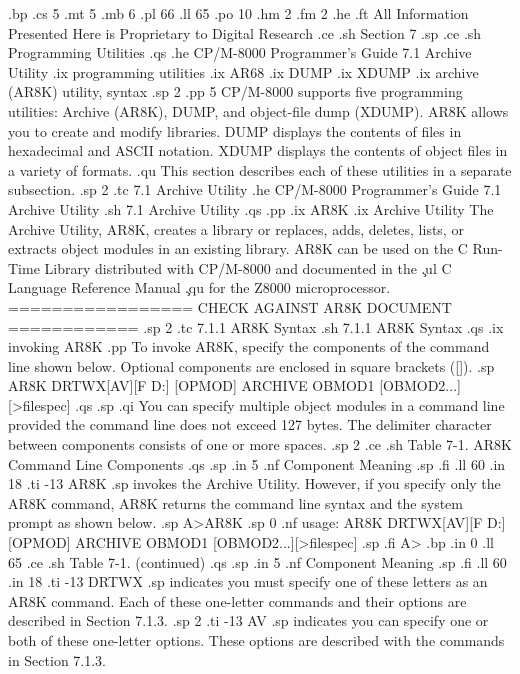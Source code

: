 .bp
.cs 5
.mt 5
.mb 6
.pl 66
.ll 65
.po 10
.hm 2
.fm 2
.he
.ft All Information Presented Here is Proprietary to Digital Research
.ce
.sh
Section 7
.sp
.ce
.sh 
Programming Utilities
.qs
.he CP/M-8000 Programmer's Guide                  7.1  Archive Utility
.ix programming utilities
.ix AR68
.ix DUMP
.ix XDUMP
.ix archive (AR8K) utility, syntax
.sp 2
.pp 5
CP/M-8000 supports five programming utilities: Archive 
(AR8K), DUMP, and object-file dump (XDUMP).
AR8K allows you to create and modify libraries.  DUMP displays the
contents of files in hexadecimal and ASCII notation.  
XDUMP displays the contents of object files in a variety of formats.
.qu
This section describes each of these utilities in a
separate subsection. 
.sp 2
.tc    7.1  Archive Utility
.he CP/M-8000 Programmer's Guide                  7.1  Archive Utility
.sh
7.1  Archive Utility
.qs
.pp 
.ix AR8K
.ix Archive Utility
The Archive Utility, AR8K, creates a library or replaces, adds,
deletes, lists, or extracts object modules in an existing
library.  AR8K can be used on the C Run-Time Library distributed
with CP/M-8000 and documented in the \c
.ul
C Language Reference Manual \c
.qu
for the Z8000 microprocessor. 
================= CHECK AGAINST AR8K DOCUMENT ============
.sp 2
.tc         7.1.1  AR8K Syntax
.sh
7.1.1  AR8K Syntax
.qs
.ix invoking AR8K 
.pp
To invoke AR8K, specify the components of the command line shown 
below.  Optional components are enclosed in square brackets ([]).
.sp
AR8K DRTWX[AV][F D:] [OPMOD] ARCHIVE OBMOD1 [OBMOD2...][>filespec]
.qs
.sp 
.qi
You can specify multiple object modules in a command line
provided the command line does not exceed 127 bytes.  The
delimiter character between components consists of one or more
spaces. 
.sp 2
.ce
.sh
Table 7-1.  AR8K Command Line Components
.qs
.sp
.in 5
.nf
Component    Meaning
.sp
.fi
.ll 60
.in 18
.ti -13
AR8K         
.sp
invokes the Archive Utility.  However, if you
specify only the AR8K command, AR8K returns the command line
syntax and the system prompt as shown below. 
.sp
A>AR8K
.sp 0
.nf
usage:  AR8K DRTWX[AV][F D:] [OPMOD] ARCHIVE OBMOD1 [OBMOD2...][>filespec]
.sp
.fi
A>
.bp
.in 0
.ll 65
.ce
.sh
Table 7-1.  (continued)
.qs
.sp
.in 5
.nf
Component    Meaning
.sp
.fi
.ll 60
.in 18
.ti -13
DRTWX        
.sp
indicates you must specify one of these letters as 
an AR8K command.  Each of these one-letter commands and
their options are described in Section 7.1.3. 
.sp 2
.ti -13
AV           
.sp
indicates you can specify one or both of these
one-letter options.  These options are described with the commands
in Section 7.1.3. 
